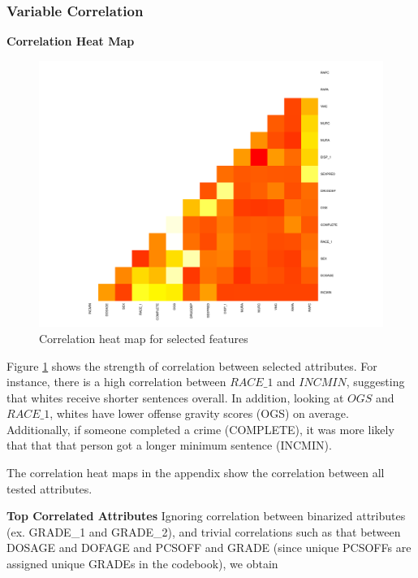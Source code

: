 \documentclass[11pt,letter]{article}
\begin{document}
\subsubsection{Variable Correlation}

\textbf{Correlation Heat Map}
\begin{figure}
	\centering
	\includegraphics[scale=0.35]{report_figures/cool.pdf}
	\caption{Correlation heat map for selected features}
	\label{corr_heat_map}
\end{figure}
Figure \ref{corr_heat_map} shows the strength of correlation between selected attributes. For instance, there is a high correlation between $RACE\_1$ and $INCMIN$, suggesting that whites receive shorter sentences overall. In addition, looking at $OGS$ and $RACE\_1$, whites have lower offense gravity scores (OGS) on average. Additionally, if someone completed a crime (COMPLETE), it was more likely that that that person got a longer minimum sentence (INCMIN).

The correlation heat maps in the appendix show the correlation between all tested attributes.

\textbf{Top Correlated Attributes}
Ignoring correlation between binarized attributes (ex. GRADE\_1 and GRADE\_2), 
and trivial correlations such as that between DOSAGE and DOFAGE and PCSOFF and GRADE (since unique PCSOFFs are assigned unique GRADEs in the codebook), we obtain
\end{document}
